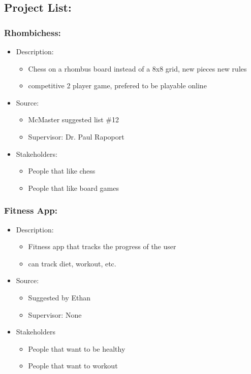 \documentclass{article}
\begin{document}
\subsection*{Project List:}
\subsubsection*{Rhombichess:}
\label{subsec:chess}
\begin{itemize}
    \item Description:
    \begin{itemize}
        \item Chess on a rhombus board instead of a 8x8 grid, new pieces new rules
        \item competitive 2 player game, prefered to be playable online
    \end{itemize}
    \item Source:
    \begin{itemize}
        \item McMaster suggested list \#12
        \item Supervisor: Dr. Paul Rapoport
    \end{itemize}
    \item Stakeholders:
    \begin{itemize}
        \item People that like chess
        \item People that like board games
    \end{itemize}
\end{itemize}

\subsubsection*{Fitness App:}
\label{subsec:fitness}
\begin{itemize}
    \item Description:
    \begin{itemize}
        \item Fitness app that tracks the progress of the user
        \item can track diet, workout, etc.
    \end{itemize}
    \item Source:
    \begin{itemize}
        \item Suggested by Ethan
        \item Supervisor: None
    \end{itemize}
    \item Stakeholders
    \begin{itemize}
        \item People that want to be healthy
        \item People that want to workout
    \end{itemize}
\end{itemize}
\end{document}
